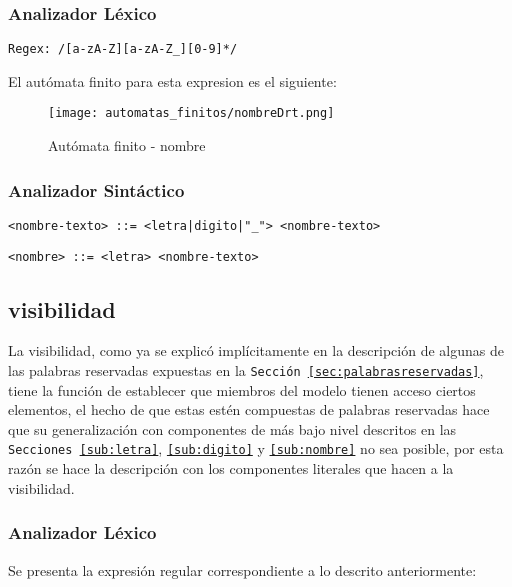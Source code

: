 \subsubsection{Analizador Léxico}

\begin{lstlisting}[basicstyle=\footnotesize\ttfamily, caption={Regex - nombre}]
  Regex: /[a-zA-Z][a-zA-Z_][0-9]*/
\end{lstlisting}

El autómata finito para esta expresion es el siguiente:

\begin{figure}[H]
	\centering
	\texttt{[image: automatas\_finitos/nombreDrt.png]}
	\caption{Autómata finito - nombre}
	\label{fig:nombre}
\end{figure}

\subsubsection{Analizador Sintáctico}

\begin{lstlisting}[basicstyle=\footnotesize\ttfamily]
  <nombre-texto> ::= <letra|digito|"_"> <nombre-texto>
\end{lstlisting}

\begin{lstlisting}[basicstyle=\footnotesize\ttfamily, caption={BNF - nombre}]
  <nombre> ::= <letra> <nombre-texto>
\end{lstlisting}


\subsection{visibilidad}
\label{sub:visibilidad}
La visibilidad, como ya se explicó implícitamente en la descripción de algunas
de las palabras reservadas expuestas en la \texttt{Sección
\ref{sec:palabrasreservadas}}, tiene la función de establecer que miembros del
modelo tienen acceso ciertos elementos, el hecho de que estas estén compuestas
de palabras reservadas hace que su generalización con componentes de más bajo
nivel descritos en las \texttt{Secciones \ref{sub:letra}},
\texttt{\ref{sub:digito}} y \texttt{\ref{sub:nombre}} no sea posible, por esta
razón se hace la descripción con los componentes literales que hacen a la
visibilidad.

\subsubsection{Analizador Léxico}
Se presenta la expresión regular correspondiente a lo descrito
anteriormente:

